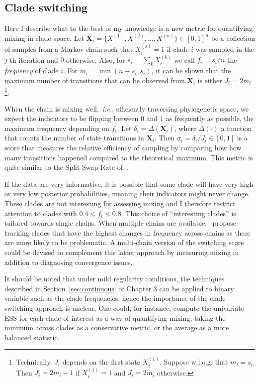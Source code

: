 \subsection{Clade switching}
\label{sec:cladeSwitch}

Here I describe  what to the best of my knowledge is a new metric for quantifying mixing in clade space.
Let $\boldsymbol X_i = \{X^{(1)}, X^{(2)}, \ldots, X^{(n)}\} \in [0, 1]^n$ be a collection of samples from a Markov chain such that $X^{(j)}_i = 1$ if clade $i$ was sampled in the $j$-th iteration and $0$ otherwise.
Also, for $s_i = \sum_k X_i^{(k)}$ we call $f_i = s_i/n$ the \textit{frequency} of clade $i$.
For $m_i = \min(n - s_i, s_i)$, it can be shown that the maximum number of transitions that can be observed from $\boldsymbol X_i$ is either $J_i = 2 m_i$
\footnote{Technically, $J_i$ depends on the first state $X_i^{(1)}$.
Suppose w.l.o.g. that $m_i = s_i$.
Then $J_i = 2 m_i - 1$ if $X_i^{(1)} = 1$ and $J_i = 2 m_i$ otherwise.
}.

When the chain is mixing well,~\textit{i.e.}, efficiently traversing phylogenetic space, we expect the indicators to be flipping between $0$ and $1$ as frequently as possible,  the maximum frequency depending on $f_i$.
Let $\delta_i = \Delta(\boldsymbol X_i)$, where $\Delta(\cdot)$ a function that counts the number of state transitions in $\boldsymbol X_i$.
Then $\sigma_i = \delta_i/J_i \in [0, 1]$ is a score that measures the relative efficiency of sampling by comparing how how many transitions happened compared to the theoretical maximum. 
This metric is quite similar to the Split Swap Rate of~\cite{Hoehna2008b}.

If the data are very informative, it is possible that some clade will have very high or very low posterior probabilities, meaning their indicators might never change.
These clades are not interesting for assessing mixing and I therefore restrict attention to clades with $0.4 \leq f_i \leq 0.8$.
This choice of ``interesting clades'' is tailored towards single chains.
When multiple chains are available,~\cite{Warren2017} propose tracking clades that have the highest changes in frequency across chains as these are more likely to be problematic.
A multi-chain version of the switching score could be devised to complement this latter approach by measuring mixing in addition to diagnosing convergence issues.

It should be noted that under mild regularity conditions, the techniques described in Section~\ref{sec:continuous} of Chapter 3 can be applied to binary variable such as the clade frequencies, hence the importance of the clade-switching approach is unclear.
One could, for instance, compute the univariate ESS for each clade of interest as a way of quantifying mixing, taking the minimum across clades as a conservative metric, or the average as a more balanced statistic. 

